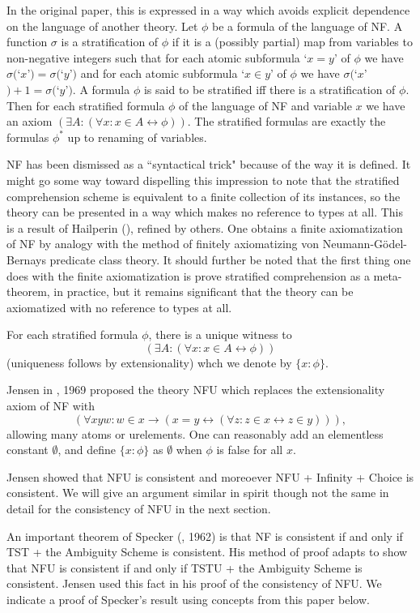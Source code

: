\documentclass[112pt]{article}
\begin{document}
In the original paper, this is expressed in a way which avoids explicit dependence on the language of another theory.  Let $\phi$ be a formula of the language of
NF.  A function $\sigma$ is a stratification of $\phi$ if it is a (possibly partial) map from variables to non-negative integers such that for each atomic subformula
`$x=y$'  of $\phi$ we have $\sigma($`$x$'$)=\sigma($`$y$'$)$ and for each atomic subformula `$x \in y$' of $\phi$ we have $\sigma($`$x$'$)+1 = \sigma($`$y$'$)$.
A formula $\phi$ is said to be stratified iff there is a stratification of $\phi$.  Then for each stratified formula $\phi$ of the language of NF and variable $x$ we have an axiom $(\exists A:(\forall x:x \in A \leftrightarrow \phi))$.  The stratified formulas are exactly the formulas $\phi^*$ up to renaming of variables.

NF has been dismissed as a ``syntactical trick" because of the way it is defined.  It might go some way toward dispelling this impression to note that the stratified comprehension scheme is equivalent to a finite collection of its instances, so the theory can be presented in a way which makes no reference to types at all.  This is a result of Hailperin (\cite{hailperin}), refined by others.  One obtains a finite axiomatization of NF by analogy with the method of finitely axiomatizing von Neumann-G\"odel-Bernays predicate class theory.  It should further be noted that the first thing one does with the finite axiomatization is prove stratified comprehension as a meta-theorem, in practice, but it remains significant that the theory can be axiomatized with no reference to types at all.

For each stratified formula $\phi$, there is a unique witness to $$(\exists A:(\forall x:x \in A \leftrightarrow \phi))$$ (uniqueness follows by extensionality) whch we denote by $\{x:\phi\}$.

Jensen in \cite{nfu}, 1969 proposed the theory NFU which replaces the extensionality axiom of NF with $$(\forall xyw:w \in x \rightarrow (x=y \leftrightarrow (\forall z:z \in x \leftrightarrow z\in y))),$$  allowing many atoms or urelements.  One can reasonably add an elementless constant $\emptyset$, and define $\{x:\phi\}$ as $\emptyset$ when $\phi$ is false for all $x$.

Jensen showed that NFU is consistent and moreoever NFU + Infinity + Choice is consistent.  We will give an argument similar in spirit though not the same in detail for the consistency of NFU in the next section.

An important theorem of Specker (\cite{ambiguity}, 1962) is that NF is consistent if and only if TST + the Ambiguity Scheme is consistent.  His method of proof adapts to show that  NFU is consistent if and only if TSTU + the Ambiguity Scheme is consistent.  Jensen used this fact in his proof of the consistency of NFU.  We indicate a proof of Specker's result using concepts from this paper below.
\end{document}
